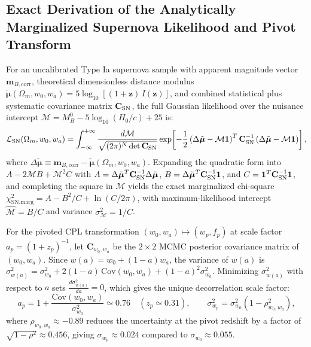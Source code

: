 \documentclass[aps,prd,preprint,superscriptaddress,nofootinbib]{revtex4-2}
\begin{document}
\subsection{Exact Derivation of the Analytically Marginalized Supernova Likelihood and Pivot Transform}

For an uncalibrated Type Ia supernova sample with apparent magnitude vector $\mathbf{m}_{B,\text{corr}}$, theoretical dimensionless distance modulus $\tilde{\boldsymbol{\mu}}(\Omega_m, w_0, w_a) = 5\log_{10}[(1+\mathbf{z})\, I(\mathbf{z})]$, and combined statistical plus systematic covariance matrix $\mathbf{C}_{\rm SN}$, the full Gaussian likelihood over the nuisance intercept $\mathcal{M} = M_B^0 - 5\log_{10}(H_0/c) + 25$ is:
\begin{equation}
    \mathcal{L}_{\rm SN}(\Omega_m, w_0, w_a) = \int_{-\infty}^{+\infty} \frac{d\mathcal{M}}{\sqrt{(2\pi)^N \det\mathbf{C}_{\rm SN}}} \exp\!\left[ -\frac{1}{2}\left(\Delta\tilde{\boldsymbol{\mu}} - \mathcal{M}\mathbf{1}\right)^T \mathbf{C}_{\rm SN}^{-1} \left(\Delta\tilde{\boldsymbol{\mu}} - \mathcal{M}\mathbf{1}\right) \right],
\end{equation}
where $\Delta\tilde{\boldsymbol{\mu}} \equiv \mathbf{m}_{B,\text{corr}} - \tilde{\boldsymbol{\mu}}(\Omega_m, w_0, w_a)$. Expanding the quadratic form into $A - 2\mathcal{M}B + \mathcal{M}^2 C$ with $A = \Delta\tilde{\boldsymbol{\mu}}^T \mathbf{C}_{\rm SN}^{-1} \Delta\tilde{\boldsymbol{\mu}}$, $B = \Delta\tilde{\boldsymbol{\mu}}^T \mathbf{C}_{\rm SN}^{-1} \mathbf{1}$, and $C = \mathbf{1}^T \mathbf{C}_{\rm SN}^{-1} \mathbf{1}$, and completing the square in $\mathcal{M}$ yields the exact marginalized chi-square $\chi^2_{\text{SN,marg}} = A - B^2/C + \ln(C/2\pi)$, with maximum-likelihood intercept $\hat{\mathcal{M}} = B/C$ and variance $\sigma_{\mathcal{M}}^2 = 1/C$.

For the pivoted CPL transformation $(w_0, w_a) \mapsto (w_p, f_p)$ at scale factor $a_p = (1+z_p)^{-1}$, let $\mathbf{C}_{w_0, w_a}$ be the $2\times 2$ MCMC posterior covariance matrix of $(w_0, w_a)$. Since $w(a) = w_0 + (1-a)w_a$, the variance of $w(a)$ is $\sigma^2_{w(a)} = \sigma_{w_0}^2 + 2(1-a)\,\text{Cov}(w_0, w_a) + (1-a)^2 \sigma_{w_a}^2$. Minimizing $\sigma^2_{w(a)}$ with respect to $a$ sets $\frac{d\sigma^2_{w(a)}}{da} = 0$, which gives the unique decorrelation scale factor:
\begin{equation}
    a_p = 1 + \frac{\text{Cov}(w_0, w_a)}{\sigma_{w_a}^2} \simeq 0.76 \quad (z_p \simeq 0.31), \qquad \sigma_{w_p}^2 = \sigma_{w_0}^2\left(1 - \rho_{w_0, w_a}^2\right),
\end{equation}
where $\rho_{w_0, w_a} \approx -0.89$ reduces the uncertainty at the pivot redshift by a factor of $\sqrt{1 - \rho^2} \approx 0.456$, giving $\sigma_{w_p} \approx 0.024$ compared to $\sigma_{w_0} \approx 0.055$.
\end{document}
